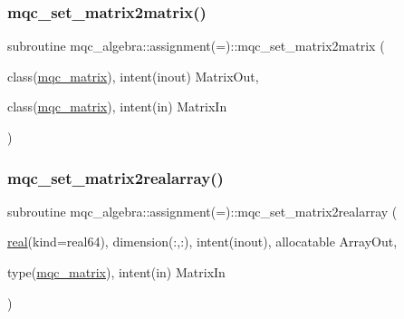 \mbox{\label{interfacemqc__algebra_1_1assignment_07_0A_08_ad3d9246331f2263ad2d8e00895d72472}} 
\subsubsection{\texorpdfstring{mqc\_set\_matrix2matrix()}{mqc\_set\_matrix2matrix()}}
{\footnotesize\ttfamily subroutine mqc\+\_\+algebra\+::assignment(=)\+::mqc\+\_\+set\+\_\+matrix2matrix (\begin{DoxyParamCaption}\item[{class(\mbox{\hyperlink{structmqc__algebra_1_1mqc__matrix}{mqc\+\_\+matrix}}), intent(inout)}]{Matrix\+Out,  }\item[{class(\mbox{\hyperlink{structmqc__algebra_1_1mqc__matrix}{mqc\+\_\+matrix}}), intent(in)}]{Matrix\+In }\end{DoxyParamCaption})}

\mbox{\label{interfacemqc__algebra_1_1assignment_07_0A_08_abeb0684ad9551afed5fbf4877518eb1e}} 
\subsubsection{\texorpdfstring{mqc\_set\_matrix2realarray()}{mqc\_set\_matrix2realarray()}}
{\footnotesize\ttfamily subroutine mqc\+\_\+algebra\+::assignment(=)\+::mqc\+\_\+set\+\_\+matrix2realarray (\begin{DoxyParamCaption}\item[{\mbox{\hyperlink{interfacemqc__algebra_1_1real}{real}}(kind=real64), dimension(\+:,\+:), intent(inout), allocatable}]{Array\+Out,  }\item[{type(\mbox{\hyperlink{structmqc__algebra_1_1mqc__matrix}{mqc\+\_\+matrix}}), intent(in)}]{Matrix\+In }\end{DoxyParamCaption})}

\mbox{\label{interfacemqc__algebra_1_1assignment_07_0A_08_a3a212c363399d2a94f8d98cd678566c3}} 
